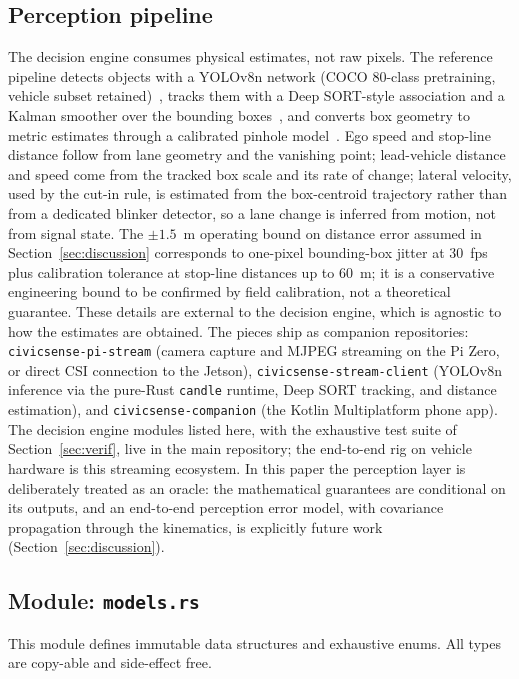 \documentclass[conference, a4paper]{IEEEtran}
\theoremstyle{plain}
\begin{document}
\subsection{Perception pipeline}
\label{sub:perception}
The decision engine consumes physical estimates, not raw pixels. The
reference pipeline detects objects with a YOLOv8n network (COCO 80-class
pretraining, vehicle subset retained)~\cite{redmon2016}, tracks them with a
Deep SORT-style association and a Kalman smoother over the bounding
boxes~\cite{wojke2017}, and converts box geometry to metric estimates
through a calibrated pinhole model~\cite{godard2019}. Ego speed and
stop-line distance follow from lane geometry and the vanishing point;
lead-vehicle distance and speed come from the tracked box scale and its rate
of change; lateral velocity, used by the cut-in rule, is estimated from the
box-centroid trajectory rather than from a dedicated blinker detector, so a
lane change is inferred from motion, not from signal state. The $\pm 1.5$~m
operating bound on distance error assumed in
Section~\ref{sec:discussion} corresponds to one-pixel bounding-box jitter
at 30~fps plus calibration tolerance at stop-line distances up to $60$~m;
it is a conservative engineering bound to be confirmed by field
calibration, not a theoretical guarantee. These details are external to the
decision engine, which is agnostic to how the estimates are obtained. The
pieces ship as companion repositories: \texttt{civicsense-pi-stream}
(camera capture and MJPEG streaming on the Pi Zero, or direct CSI
connection to the Jetson),
\texttt{civicsense-stream-client} (YOLOv8n inference via the pure-Rust
\texttt{candle} runtime, Deep SORT tracking, and distance estimation), and
\texttt{civicsense-companion} (the Kotlin Multiplatform phone app). The
decision engine modules listed here, with the exhaustive test suite of
Section~\ref{sec:verif}, live in the main repository; the end-to-end rig on
vehicle hardware is this streaming ecosystem. In this paper the perception
layer is deliberately treated as an oracle: the mathematical guarantees are
conditional on its outputs, and an end-to-end perception error model, with
covariance propagation through the kinematics, is explicitly future work
(Section~\ref{sec:discussion}).

\subsection{Module: \texttt{models.rs}}
\label{sub:models}
This module defines immutable data structures and exhaustive enums. All
types are copy-able and side-effect free.
\end{document}
